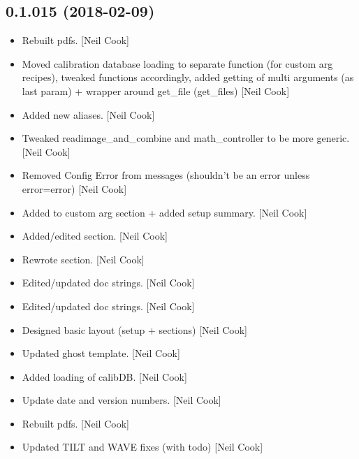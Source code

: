 \documentclass[a4paper,10pt,english]{report}
\begin{document}
\subsection{0.1.015 (2018-02-09)}
\label{\detokenize{misc/changelog:id487}}\begin{itemize}
\item {} 
Rebuilt pdfs. {[}Neil Cook{]}

\item {} 
Moved calibration database loading to separate function (for custom
arg recipes), tweaked functions accordingly, added getting of multi
arguments (as last param) + wrapper around get\_file (get\_files) {[}Neil
Cook{]}

\item {} 
Added new aliases. {[}Neil Cook{]}

\item {} 
Tweaked readimage\_and\_combine and math\_controller to be more generic.
{[}Neil Cook{]}

\item {} 
Removed Config Error from messages (shouldn’t be an error unless
error=error) {[}Neil Cook{]}

\item {} 
Added to custom arg section + added setup summary. {[}Neil Cook{]}

\item {} 
Added/edited section. {[}Neil Cook{]}

\item {} 
Rewrote section. {[}Neil Cook{]}

\item {} 
Edited/updated doc strings. {[}Neil Cook{]}

\item {} 
Edited/updated doc strings. {[}Neil Cook{]}

\item {} 
Designed basic layout (setup + sections) {[}Neil Cook{]}

\item {} 
Updated ghost template. {[}Neil Cook{]}

\item {} 
Added loading of calibDB. {[}Neil Cook{]}

\item {} 
Update date and version numbers. {[}Neil Cook{]}

\item {} 
Rebuilt pdfs. {[}Neil Cook{]}

\item {} 
Updated TILT and WAVE fixes (with todo) {[}Neil Cook{]}


\end{itemize}
\end{document}
